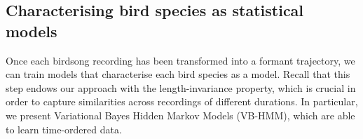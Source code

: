 \documentclass[pdftex,11pt,a4paper]{article}
\theoremstyle{definition}
\theoremstyle{remark}
\begin{document}
\subsection{Characterising bird species as statistical models}
Once each birdsong recording has been transformed into a formant trajectory, we can train models that characterise each bird species as a model. Recall that this step endows our approach with the length-invariance property, which is crucial in order to capture similarities across recordings of different durations. In particular, we present Variational Bayes Hidden Markov Models (VB-HMM), which are able to learn time-ordered data. 

\end{document}

